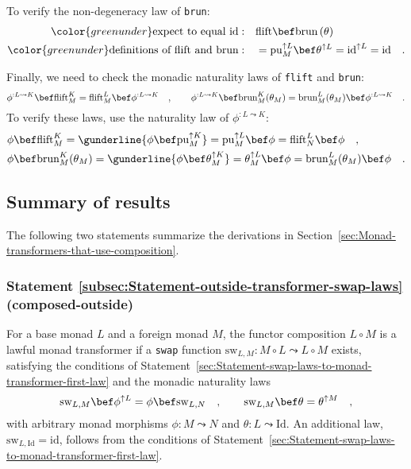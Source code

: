 To verify the non-degeneracy law of \lstinline!brun!:
\begin{align*}
{\color{greenunder}\text{expect to equal }\text{id}:}\quad & \text{flift}\bef\text{brun}\left(\theta\right)\\
{\color{greenunder}\text{definitions of }\text{flift}\text{ and }\text{brun}:}\quad & =\text{pu}_{M}^{\uparrow L}\bef\theta^{\uparrow L}=\text{id}^{\uparrow L}=\text{id}\quad.
\end{align*}

Finally, we need to check the monadic naturality laws of \lstinline!flift!
and \lstinline!brun!:
\[
\phi^{:L\leadsto K}\bef\text{flift}_{M}^{K}=\text{flift}_{M}^{L}\bef\phi^{:L\leadsto K}\quad,\quad\quad\phi^{:L\leadsto K}\bef\text{brun}_{M}^{K}(\theta_{M})=\text{brun}_{M}^{L}(\theta_{M})\bef\phi^{:L\leadsto K}\quad.
\]
To verify these laws, use the naturality law of $\phi^{:L\leadsto K}$:
\begin{align*}
 & \phi\bef\text{flift}_{M}^{K}=\gunderline{\phi\bef\text{pu}_{M}^{\uparrow K}}=\text{pu}_{M}^{\uparrow L}\bef\phi=\text{flift}_{N}^{L}\bef\phi\quad,\\
 & \phi\bef\text{brun}_{M}^{K}(\theta_{M})=\gunderline{\phi\bef\theta_{M}^{\uparrow K}}=\theta_{M}^{\uparrow L}\bef\phi=\text{brun}_{M}^{L}(\theta_{M})\bef\phi\quad.
\end{align*}


\subsection{Summary of results}

The following two statements summarize the derivations in Section~\ref{sec:Monad-transformers-that-use-composition}.

\subsubsection{Statement \label{subsec:Statement-outside-transformer-swap-laws}\ref{subsec:Statement-outside-transformer-swap-laws}
(composed-outside)}

For a base monad $L$ and a foreign monad $M$, the functor composition
$L\circ M$ is a lawful monad transformer if a \lstinline!swap! function
$\text{sw}_{L,M}:M\circ L\leadsto L\circ M$ exists, satisfying the
conditions of Statement~\ref{sec:Statement-swap-laws-to-monad-transformer-first-law}
and the monadic naturality laws
\[
\text{sw}_{L,M}\bef\phi^{\uparrow L}=\phi\bef\text{sw}_{L,N}\quad,\quad\quad\text{sw}_{L,M}\bef\theta=\theta^{\uparrow M}\quad,
\]
with arbitrary monad morphisms $\phi:M\leadsto N$ and $\theta:L\leadsto\text{Id}$.
An additional law, $\text{sw}_{L,\text{Id}}=\text{id}$, follows from
the conditions of Statement~\ref{sec:Statement-swap-laws-to-monad-transformer-first-law}.

